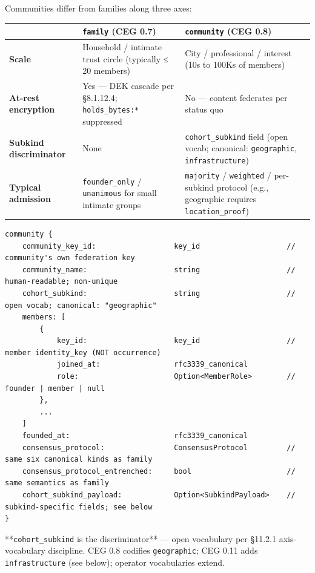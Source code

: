 \documentclass[10pt]{article}
\begin{document}
Communities differ from families along three axes:


{\footnotesize
\begin{longtable}{|p{5.33cm}|p{5.33cm}|p{5.33cm}|}\hline
\textbf{} & \textbf{\texttt{family} (CEG 0.7)} & \textbf{\texttt{community} (CEG 0.8)} \\ \hline\endhead
\textbf{Scale} & Household / intimate trust circle (typically ≤ 20 members) & City / professional / interest (10s to 100Ks of members) \\ \hline
\textbf{At-rest encryption} & Yes — DEK cascade per §8.1.12.4; \texttt{holds\_bytes:*} suppressed & No — content federates per status quo \\ \hline
\textbf{Subkind discriminator} & None & \texttt{cohort\_subkind} field (open vocab; canonical: \texttt{geographic}, \texttt{infrastructure}) \\ \hline
\textbf{Typical admission} & \texttt{founder\_only} / \texttt{unanimous} for small intimate groups & \texttt{majority} / \texttt{weighted} / per-subkind protocol (e.g., geographic requires \texttt{location\_proof}) \\ \hline
\end{longtable}}


\begin{lstlisting}
community {
    community_key_id:                  key_id                    // community's own federation key
    community_name:                    string                    // human-readable; non-unique
    cohort_subkind:                    string                    // open vocab; canonical: "geographic"
    members: [
        {
            key_id:                    key_id                    // member identity_key (NOT occurrence)
            joined_at:                 rfc3339_canonical
            role:                      Option<MemberRole>        // founder | member | null
        },
        ...
    ]
    founded_at:                        rfc3339_canonical
    consensus_protocol:                ConsensusProtocol         // same six canonical kinds as family
    consensus_protocol_entrenched:     bool                      // same semantics as family
    cohort_subkind_payload:            Option<SubkindPayload>    // subkind-specific fields; see below
}
\end{lstlisting}

**\texttt{cohort\_subkind} is the discriminator** — open vocabulary per §11.2.1 axis-vocabulary discipline. CEG 0.8 codifies \texttt{geographic}; CEG 0.11 adds \texttt{infrastructure} (see below); operator vocabularies extend.
\end{document}

